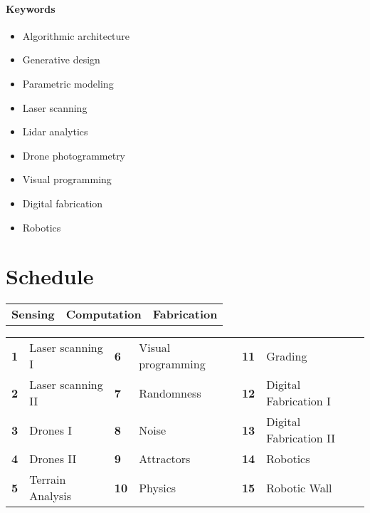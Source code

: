 \documentclass[11pt,article,oneside]{memoir}
\begin{document}
\paragraph{Keywords}
\begin{multicols}{3}
\raggedright
\small
\begin{itemize}
\item Algorithmic architecture
\item Generative design
\item Parametric modeling
\item Laser scanning
\item Lidar analytics
\item Drone photogrammetry
\item Visual programming
\item Digital fabrication
\item Robotics
\end{itemize}
\end{multicols}

\section{Schedule}

\begin{table}[H]
\begin{tabular}{l @{\hskip 2.1cm} l @{\hskip 2cm} l}
\textbf{Sensing} & \textbf{Computation} & \textbf{Fabrication}\\
\end{tabular}
\end{table}
%
\vspace*{-1em}
%
\begin{table}[H]
\small
\begin{tabular}{l l l l l l}
\small
\textbf{1} & Laser scanning  I  & \textbf{6} & Visual programming & \textbf{11} & Grading\\
\textbf{2} & Laser scanning  II & \textbf{7} & Randomness & \textbf{12} & Digital Fabrication I\\
\textbf{3} & Drones I & \textbf{8} & Noise & \textbf{13} & Digital Fabrication II\\
\textbf{4} & Drones II  & \textbf{9} & Attractors & \textbf{14} & Robotics\\
\textbf{5} & Terrain Analysis & \textbf{10} & Physics & \textbf{15} & Robotic Wall\\

\end{tabular}
\end{table}
\end{document}
